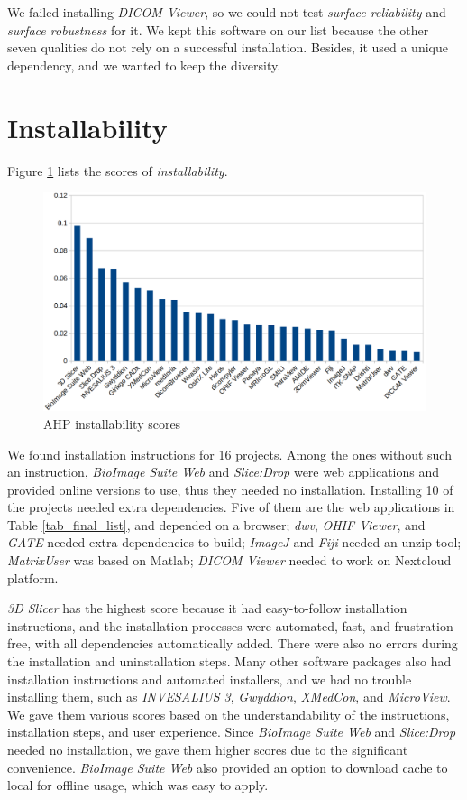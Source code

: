 We failed installing \textit{DICOM Viewer}, so we could not test \textit{surface reliability} and \textit{surface robustness} for it. We kept this software on our list because the other seven qualities do not rely on a successful installation. Besides, it used a unique dependency, and we wanted to keep the diversity.

\section{Installability}
\label{sec_result_installability}

Figure \ref{fg_installability_scores} lists the scores of \textit{installability}.

\begin{figure}[H]
\includegraphics[scale=0.38]{figures/installability_scores.png}
\caption{AHP installability scores}
\label{fg_installability_scores}
\end{figure}

We found installation instructions for 16 projects. Among the ones without such an instruction, \textit{BioImage Suite Web} and \textit{Slice:Drop} were web applications and provided online versions to use, thus they needed no installation. Installing 10 of the projects needed extra dependencies. Five of them are the web applications in Table \ref{tab_final_list}, and depended on a browser; \textit{dwv}, \textit{OHIF Viewer}, and \textit{GATE} needed extra dependencies to build; \textit{ImageJ} and	\textit{Fiji} needed an unzip tool; \textit{MatrixUser} was based on Matlab; \textit{DICOM Viewer} needed to work on Nextcloud platform.

\textit{3D Slicer} has the highest score because it had easy-to-follow installation instructions, and the installation processes were automated, fast, and frustration-free, with all dependencies automatically added. There were also no errors during the installation and uninstallation steps. Many other software packages also had installation instructions and automated installers, and we had no trouble installing them, such as \textit{INVESALIUS 3}, \textit{Gwyddion}, \textit{XMedCon}, and \textit{MicroView}. We gave them various scores based on the understandability of the instructions, installation steps, and user experience. Since \textit{BioImage Suite Web} and \textit{Slice:Drop} needed no installation, we gave them higher scores due to the significant convenience. \textit{BioImage Suite Web} also provided an option to download cache to local for offline usage, which was easy to apply.

